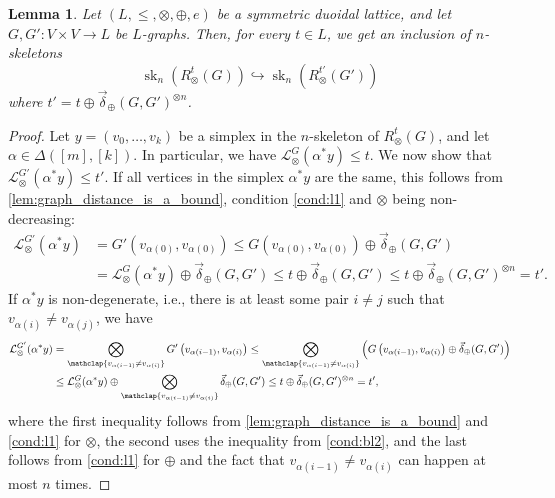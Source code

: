 \documentclass[a4paper,11pt]{article}
\newcommand{\tensor}{\otimes}
\newcommand{\bigtensor}{\bigotimes}
\newcommand{\atensor}{\oplus}
\newcounter{dummy}\numberwithin{dummy}{section}
\newtheorem{lemma}[dummy]{Lemma}
\theoremstyle{remark}
\begin{document}
\begin{lemma}\label{stabilitylemma}
Let $(L,\leq,\tensor,\atensor,e)$ be a symmetric duoidal lattice, and let $G,G'\colon V\times V\to L$ be $L$-graphs. Then, for every $t\in L$, we get an inclusion of $n$-skeletons
\begin{equation*}
\operatorname{sk}_n\left(R_\tensor^t(G)\right)\hookrightarrow\operatorname{sk}_n\left(R_\tensor^{t'}(G')\right)
\end{equation*}
where $t'=t\atensor\vec{\delta}_\atensor(G,G')^{\tensor n}$.
\end{lemma}
\begin{proof}
Let $y=(v_0,\ldots,v_k)$ be a simplex in the $n$-skeleton of $R_\tensor^t(G)$, and let $\alpha\in\Delta([m],[k])$. In particular, we have $\mathcal{L}_\tensor^{G}(\alpha^*y)\leq t$. We now show that $\mathcal{L}_\tensor^{G'}(\alpha^*y)\leq t'$. If all vertices in the simplex $\alpha^*y$ are the same, this follows from \cref{lem:graph_distance_is_a_bound}, condition \ref{cond:l1} and $\tensor$ being non-decreasing:
\begin{align*}
\mathcal{L}_\tensor^{G'}(\alpha^*y)&=G'\left(v_{\alpha(0)}, v_{\alpha(0)}\right)\leq G\left(v_{\alpha(0)}, v_{\alpha(0)}\right)\atensor\vec{\delta}_\atensor(G,G')\\
&=\mathcal{L}_\tensor^{G}(\alpha^*y)\atensor\vec{\delta}_\atensor(G,G')\leq t\atensor\vec{\delta}_\atensor(G,G')\leq t\atensor\vec{\delta}_\atensor(G,G')^{\tensor n}=t'.
\end{align*}
If $\alpha^*y$ is non-degenerate, i.e., there is at least some pair $i\neq j$ such that $v_{\alpha (i)}\neq v_{\alpha (j)}$, we have
\begin{align*}
\mathcal{L}_\tensor^{G'}(\alpha^*y)&=\bigtensor_{\mathclap{v_{\alpha(i-1)}\neq v_{\alpha(i)}}}G'\left(v_{\alpha(i-1)}, v_{\alpha(i)}\right)\leq\bigtensor_{\mathclap{v_{\alpha(i-1)}\neq v_{\alpha(i)}}}\left(G\left(v_{\alpha(i-1)}, v_{\alpha(i)}\right)\atensor\vec{\delta}_\atensor(G,G')\right)\\
&\leq \mathcal{L}_\tensor^{G}(\alpha^*y)\atensor\bigtensor_{\mathclap{v_{\alpha(i-1)}\neq v_{\alpha(i)}}}\vec{\delta}_\atensor(G,G')\leq t\atensor \vec{\delta}_\atensor(G,G')^{\tensor n}=t',
\end{align*}
where the first inequality follows from \cref{lem:graph_distance_is_a_bound} and \ref{cond:l1} for $\tensor$, the second uses the inequality from \ref{cond:bl2},  and the last follows from \ref{cond:l1} for $\atensor$ and the fact that  $v_{\alpha(i-1)}\neq v_{\alpha(i)}$ can happen at most $n$ times.
\end{proof}
\end{document}
